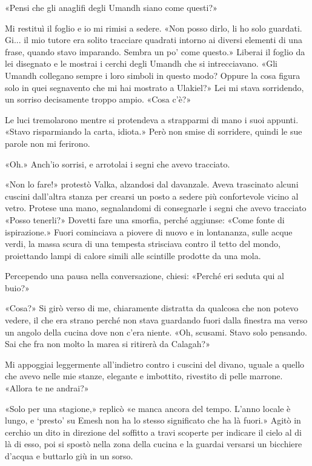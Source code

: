 «Pensi che gli anaglifi degli Umandh siano come questi?»

Mi restituì il foglio e io mi rimisi a sedere. «Non posso dirlo, li ho
solo guardati. Gi... il mio tutore era solito tracciare quadrati intorno
ai diversi elementi di una frase, quando stavo imparando. Sembra un po'
come questo.» Liberai il foglio da lei disegnato e le mostrai i cerchi
degli Umandh che si intrecciavano. «Gli Umandh collegano sempre i loro
simboli in questo modo? Oppure la cosa figura solo in quei segnavento
che mi hai mostrato a Ulakiel?» Lei mi stava sorridendo, un sorriso
decisamente troppo ampio. «Cosa c'è?»

Le luci tremolarono mentre si protendeva a strapparmi di mano i suoi
appunti. «Stavo risparmiando la carta, idiota.» Però non smise di
sorridere, quindi le sue parole non mi ferirono.

«Oh.» Anch'io sorrisi, e arrotolai i segni che avevo tracciato.

«Non lo fare!» protestò Valka, alzandosi dal davanzale. Aveva trascinato
alcuni cuscini dall'altra stanza per crearsi un posto a sedere più
confortevole vicino al vetro. Protese una mano, segnalandomi di
consegnarle i segni che avevo tracciato «Posso tenerli?» Dovetti fare
una smorfia, perché aggiunse: «Come fonte di ispirazione.» Fuori
cominciava a piovere di nuovo e in lontananza, sulle acque verdi, la
massa scura di una tempesta strisciava contro il tetto del mondo,
proiettando lampi di calore simili alle scintille prodotte da una mola.

Percependo una pausa nella conversazione, chiesi: «Perché eri seduta qui
al buio?»

«Cosa?» Si girò verso di me, chiaramente distratta da qualcosa che non
potevo vedere, il che era strano perché non stava guardando fuori dalla
finestra ma verso un angolo della cucina dove non c'era niente. «Oh,
scusami. Stavo solo pensando. Sai che fra non molto la marea si ritirerà
da Calagah?»

Mi appoggiai leggermente all'indietro contro i cuscini del divano,
uguale a quello che avevo nelle mie stanze, elegante e imbottito,
rivestito di pelle marrone. «Allora te ne andrai?»

«Solo per una stagione,» replicò «e manca ancora del tempo. L'anno
locale è lungo, e `presto' su Emesh non ha lo stesso significato che ha
là fuori.» Agitò in cerchio un dito in direzione del soffitto a travi
scoperte per indicare il cielo al di là di esso, poi si spostò nella
zona della cucina e la guardai versarsi un bicchiere d'acqua e buttarlo
giù in un sorso.

